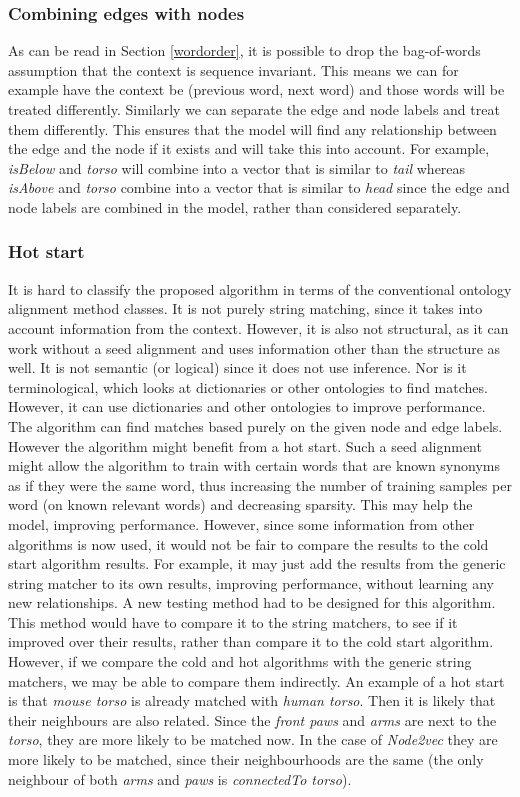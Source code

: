 \documentclass{article}
\begin{document}
  \subsubsection{Combining edges with nodes}
  As can be read in Section \ref{wordorder}, it is possible to drop the bag-of-words assumption that the context is sequence invariant.
  This means we can for example have the context be (previous word, next word) and those words will be treated differently. Similarly we can separate the edge and node labels and treat them differently. This ensures that the model will find any relationship between the edge and the node if it exists and will take this into account. For example, \emph{isBelow} and \emph{torso} will combine into a vector that is similar to \emph{tail} whereas \emph{isAbove} and \emph{torso} combine into a vector that is similar to \emph{head} since the edge and node labels are combined in the model, rather than considered separately.
  \subsubsection{Hot start}
  It is hard to classify the proposed algorithm in terms of the conventional ontology alignment method classes. It is not purely string matching, since it takes into account information from the context. However, it is also not structural, as it can work without a seed alignment and uses information other than the structure as well. It is not semantic (or logical) since it does not use inference. Nor is it terminological, which looks at dictionaries or other ontologies to find matches. However, it can use dictionaries and other ontologies to improve performance.
  The algorithm can find matches based purely on the given node and edge labels. However the algorithm might benefit from a hot start. Such a seed alignment might allow the algorithm to train with certain words that are known synonyms as if they were the same word, thus increasing the number of training samples per word (on known relevant words) and decreasing sparsity. This may help the model, improving performance. However, since some information from other algorithms is now used, it would not be fair to compare the results to the cold start algorithm results. For example, it may just add the results from the generic string matcher to its own results, improving performance, without learning any new relationships. A new testing method had to be designed for this algorithm. This method would have to compare it to the string matchers, to see if it improved over their results, rather than compare it to the cold start algorithm. However, if we compare the cold and hot algorithms with the generic string matchers, we may be able to compare them indirectly.
  An example of a hot start is that \emph{mouse torso} is already matched with \emph{human torso}. Then it is likely that their neighbours are also related. Since the \emph{front paws} and \emph{arms} are next to the \emph{torso}, they are more likely to be matched now. In the case of \emph{Node2vec} they are more likely to be matched, since their neighbourhoods are the same (the only neighbour of both \emph{arms} and \emph{paws} is \emph{connectedTo torso}).
\end{document}
